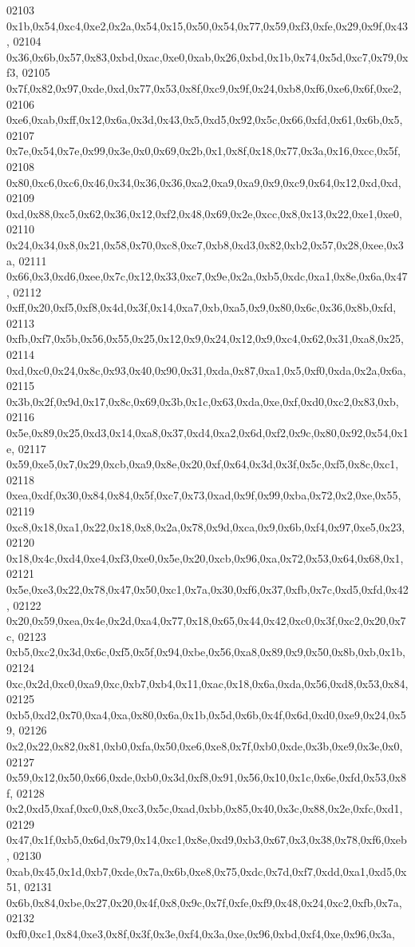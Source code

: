 \begin{DoxyCode}
02103   0x1b,0x54,0xc4,0xe2,0x2a,0x54,0x15,0x50,0x54,0x77,0x59,0xf3,0xfe,0x29,0x9f,0x43,
02104   0x36,0x6b,0x57,0x83,0xbd,0xac,0xe0,0xab,0x26,0xbd,0x1b,0x74,0x5d,0xc7,0x79,0xf3,
02105   0x7f,0x82,0x97,0xde,0xd,0x77,0x53,0x8f,0xc9,0x9f,0x24,0xb8,0xf6,0xe6,0x6f,0xe2,
02106   0xe6,0xab,0xff,0x12,0x6a,0x3d,0x43,0x5,0xd5,0x92,0x5c,0x66,0xfd,0x61,0x6b,0x5,
02107   0x7e,0x54,0x7e,0x99,0x3e,0x0,0x69,0x2b,0x1,0x8f,0x18,0x77,0x3a,0x16,0xcc,0x5f,
02108   0x80,0xc6,0xc6,0x46,0x34,0x36,0x36,0xa2,0xa9,0xa9,0x9,0xc9,0x64,0x12,0xd,0xd,
02109   0xd,0x88,0xc5,0x62,0x36,0x12,0xf2,0x48,0x69,0x2e,0xcc,0x8,0x13,0x22,0xe1,0xe0,
02110   0x24,0x34,0x8,0x21,0x58,0x70,0xc8,0xc7,0xb8,0xd3,0x82,0xb2,0x57,0x28,0xee,0x3a,
02111   0x66,0x3,0xd6,0xee,0x7c,0x12,0x33,0xc7,0x9e,0x2a,0xb5,0xdc,0xa1,0x8e,0x6a,0x47,
02112   0xff,0x20,0xf5,0xf8,0x4d,0x3f,0x14,0xa7,0xb,0xa5,0x9,0x80,0x6c,0x36,0x8b,0xfd,
02113   0xfb,0xf7,0x5b,0x56,0x55,0x25,0x12,0x9,0x24,0x12,0x9,0xc4,0x62,0x31,0xa8,0x25,
02114   0xd,0xc0,0x24,0x8c,0x93,0x40,0x90,0x31,0xda,0x87,0xa1,0x5,0xf0,0xda,0x2a,0x6a,
02115   0x3b,0x2f,0x9d,0x17,0x8c,0x69,0x3b,0x1c,0x63,0xda,0xe,0xf,0xd0,0xc2,0x83,0xb,
02116   0x5e,0x89,0x25,0xd3,0x14,0xa8,0x37,0xd4,0xa2,0x6d,0xf2,0x9c,0x80,0x92,0x54,0x1e,
02117   0x59,0xe5,0x7,0x29,0xcb,0xa9,0x8e,0x20,0xf,0x64,0x3d,0x3f,0x5c,0xf5,0x8c,0xc1,
02118   0xea,0xdf,0x30,0x84,0x84,0x5f,0xc7,0x73,0xad,0x9f,0x99,0xba,0x72,0x2,0xe,0x55,
02119   0xc8,0x18,0xa1,0x22,0x18,0x8,0x2a,0x78,0x9d,0xca,0x9,0x6b,0xf4,0x97,0xe5,0x23,
02120   0x18,0x4c,0xd4,0xe4,0xf3,0xe0,0x5e,0x20,0xcb,0x96,0xa,0x72,0x53,0x64,0x68,0x1,
02121   0x5e,0xe3,0x22,0x78,0x47,0x50,0xc1,0x7a,0x30,0xf6,0x37,0xfb,0x7c,0xd5,0xfd,0x42,
02122   0x20,0x59,0xea,0x4e,0x2d,0xa4,0x77,0x18,0x65,0x44,0x42,0xc0,0x3f,0xc2,0x20,0x7c,
02123   0xb5,0xc2,0x3d,0x6c,0xf5,0x5f,0x94,0xbe,0x56,0xa8,0x89,0x9,0x50,0x8b,0xb,0x1b,
02124   0xc,0x2d,0xc0,0xa9,0xc,0xb7,0xb4,0x11,0xac,0x18,0x6a,0xda,0x56,0xd8,0x53,0x84,
02125   0xb5,0xd2,0x70,0xa4,0xa,0x80,0x6a,0x1b,0x5d,0x6b,0x4f,0x6d,0xd0,0xe9,0x24,0x59,
02126   0x2,0x22,0x82,0x81,0xb0,0xfa,0x50,0xe6,0xe8,0x7f,0xb0,0xde,0x3b,0xe9,0x3e,0x0,
02127   0x59,0x12,0x50,0x66,0xde,0xb0,0x3d,0xf8,0x91,0x56,0x10,0x1c,0x6e,0xfd,0x53,0x8f,
02128   0x2,0xd5,0xaf,0xc0,0x8,0xc3,0x5c,0xad,0xbb,0x85,0x40,0x3c,0x88,0x2e,0xfc,0xd1,
02129   0x47,0x1f,0xb5,0x6d,0x79,0x14,0xc1,0x8e,0xd9,0xb3,0x67,0x3,0x38,0x78,0xf6,0xeb,
02130   0xab,0x45,0x1d,0xb7,0xde,0x7a,0x6b,0xe8,0x75,0xdc,0x7d,0xf7,0xdd,0xa1,0xd5,0x51,
02131   0x6b,0x84,0xbe,0x27,0x20,0x4f,0x8,0x9c,0x7f,0xfe,0xf9,0x48,0x24,0xc2,0xfb,0x7a,
02132   0xf0,0xc1,0x84,0xe3,0x8f,0x3f,0x3e,0xf4,0x3a,0xe,0x96,0xbd,0xf4,0xe,0x96,0x3a,

\end{DoxyCode}
